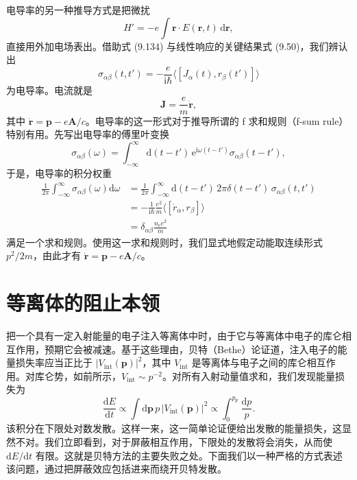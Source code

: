 电导率的另一种推导方式是把微扰
\begin{equation*}
H'=-e\int\mathbf{r}\cdot E(\mathbf{r},t)\,\mathrm{d}\mathbf{r},
\tag{9.139}
\end{equation*}
直接用外加电场表出。借助式 (9.134) 与线性响应的关键结果式 (9.50)，我们辨认出
\begin{equation*}
\sigma_{\alpha\beta}(t,t')=-\frac{e}{\mathrm{i}\hbar}\langle[J_{\alpha}(t),r_{\beta}(t')]\rangle
\tag{9.140}
\end{equation*}
为电导率。电流就是
\begin{equation*}
\mathbf{J}=\frac{e}{m}\dot{\mathbf{r}},
\tag{9.141}
\end{equation*}
其中 $\dot{\mathbf{r}}=\mathbf{p}-e\mathbf{A}/c$。电导率的这一形式对于推导所谓的 f 求和规则（f-sum rule）特别有用。先写出电导率的傅里叶变换
\begin{equation*}
\sigma_{\alpha\beta}(\omega)=\int_{-\infty}^{\infty}\mathrm{d}(t-t')\,\mathrm{e}^{\mathrm{i}\omega(t-t')}\sigma_{\alpha\beta}(t-t'),
\tag{9.142}
\end{equation*}
于是，电导率的积分权重
\begin{align*}
\frac{1}{2\pi}\int_{-\infty}^{\infty}\sigma_{\alpha\beta}(\omega)\mathrm{d}\omega&=\frac{1}{2\pi}\int_{-\infty}^{\infty}\mathrm{d}(t-t')\,2\pi\delta(t-t')\,\sigma_{\alpha\beta}(t,t')\\
&=-\frac{1}{\mathrm{i}\hbar}\frac{e^{2}}{m}\langle[\dot{r}_{\alpha},r_{\beta}]\rangle\\
&=\delta_{\alpha\beta}\frac{n_{\mathrm{e}}e^{2}}{m}
\tag{9.143}
\end{align*}
满足一个求和规则。使用这一求和规则时，我们显式地假定动能取连续形式 $p^{2}/2m$，由此才有 $\dot{\mathbf{r}}=\mathbf{p}-e\mathbf{A}/c$。

\section{等离体的阻止本领}

把一个具有一定入射能量的电子注入等离体中时，由于它与等离体中电子的库仑相互作用，预期它会被减速。基于这些理由，贝特（Bethe）论证道，注入电子的能量损失率应当正比于 $|V_{\mathrm{int}}(\mathbf{p})|^{2}$，其中 $V_{\mathrm{int}}$ 是等离体与电子之间的库仑相互作用。对库仑势，如前所示，$V_{\mathrm{int}}\sim p^{-2}$。对所有入射动量值求和，我们发现能量损失为
\begin{equation*}
\frac{\mathrm{d}E}{\mathrm{d}t}\propto\int\mathrm{d}\mathbf{p}\,p\,|V_{\mathrm{int}}(\mathbf{p})|^{2}\propto\int_{0}^{p_{\mathrm{F}}}\frac{\mathrm{d}p}{p}.
\tag{9.144}
\end{equation*}
该积分在下限处对数发散。这样一来，这一简单论证便给出发散的能量损失，这显然不对。我们立即看到，对于屏蔽相互作用，下限处的发散将会消失，从而使 $\mathrm{d}E/\mathrm{d}t$ 有限。这就是贝特方法的主要失败之处。下面我们以一种严格的方式表述该问题，通过把屏蔽效应包括进来而绕开贝特发散。


